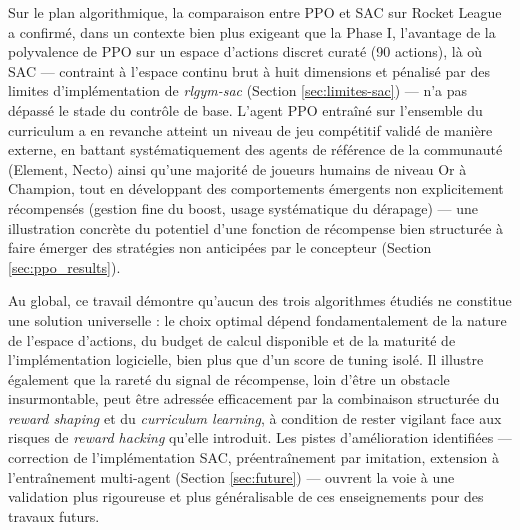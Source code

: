 Sur le plan algorithmique, la comparaison entre PPO et SAC sur Rocket League a confirmé, dans un contexte bien plus exigeant que la Phase I, l'avantage de la polyvalence de PPO sur un espace d'actions discret curaté (90 actions), là où SAC — contraint à l'espace continu brut à huit dimensions et pénalisé par des limites d'implémentation de \textit{rlgym-sac} (Section \ref{sec:limites-sac}) — n'a pas dépassé le stade du contrôle de base. L'agent PPO entraîné sur l'ensemble du curriculum a en revanche atteint un niveau de jeu compétitif validé de manière externe, en battant systématiquement des agents de référence de la communauté (Element, Necto) ainsi qu'une majorité de joueurs humains de niveau Or à Champion, tout en développant des comportements émergents non explicitement récompensés (gestion fine du boost, usage systématique du dérapage) — une illustration concrète du potentiel d'une fonction de récompense bien structurée à faire émerger des stratégies non anticipées par le concepteur (Section \ref{sec:ppo_results}).

Au global, ce travail démontre qu'aucun des trois algorithmes étudiés ne constitue une solution universelle : le choix optimal dépend fondamentalement de la nature de l'espace d'actions, du budget de calcul disponible et de la maturité de l'implémentation logicielle, bien plus que d'un score de tuning isolé. Il illustre également que la rareté du signal de récompense, loin d'être un obstacle insurmontable, peut être adressée efficacement par la combinaison structurée du \textit{reward shaping} et du \textit{curriculum learning}, à condition de rester vigilant face aux risques de \textit{reward hacking} qu'elle introduit. Les pistes d'amélioration identifiées — correction de l'implémentation SAC, préentraînement par imitation, extension à l'entraînement multi-agent (Section \ref{sec:future}) — ouvrent la voie à une validation plus rigoureuse et plus généralisable de ces enseignements pour des travaux futurs.